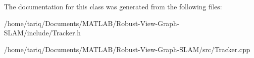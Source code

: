 The documentation for this class was generated from the following files\+:\begin{DoxyCompactItemize}
\item 
/home/tariq/\+Documents/\+M\+A\+T\+L\+A\+B/\+Robust-\/\+View-\/\+Graph-\/\+S\+L\+A\+M/include/Tracker.\+h\item 
/home/tariq/\+Documents/\+M\+A\+T\+L\+A\+B/\+Robust-\/\+View-\/\+Graph-\/\+S\+L\+A\+M/src/Tracker.\+cpp\end{DoxyCompactItemize}
